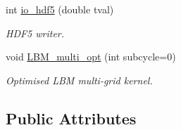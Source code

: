 \begin{DoxyCompactItemize}
int \hyperlink{class_grid_obj_adc960ac818748b839e81d1375782caa7}{io\+\_\+hdf5} (double tval)
\begin{DoxyCompactList}\small\item\em H\+D\+F5 writer. \end{DoxyCompactList}\item 
void \hyperlink{class_grid_obj_ac65e9a1a8aa854d25281780d6b52665b}{L\+B\+M\+\_\+multi\+\_\+opt} (int subcycle=0)
\begin{DoxyCompactList}\small\item\em Optimised L\+BM multi-\/grid kernel. \end{DoxyCompactList}\end{DoxyCompactItemize}
\subsection*{Public Attributes}
